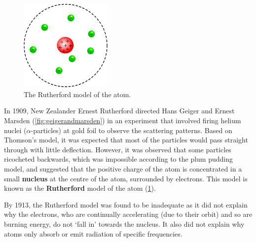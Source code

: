 \documentclass[a4paper]{amsbook}
\theoremstyle{definition}
\numberwithin{exercise}{chapter}
\numberwithin{exercise}{chapter}
\begin{document}
\begin{figure}
  \centering
  \includegraphics[width=0.4\textwidth]{ruthmodel}
  \caption{The Rutherford model of the atom. \label{fig:ruthmodel}}
\end{figure}
In 1909, New Zealander Ernest Rutherford directed Hans Geiger and Ernest Marsden (\cref{fig:geigerandmarsden}) in an experiment
that involved firing helium nuclei ($\alpha$-particles) at gold foil to observe the scattering patterns. Based on Thomson's model,
it was expected that most of the particles would pass straight through with little deflection. However, it was observed that some
particles ricocheted backwards, which was impossible according to the plum pudding model, and suggested that the positive charge
of the atom is concentrated in a small \textbf{nucleus} at the centre of the atom, surrounded by electrons. This model is known
as the \textbf{Rutherford} model of the atom (\cref{fig:ruthmodel}).

By 1913, the Rutherford model was found to be inadequate as it did not explain why the electrons, who are continually accelerating (due
to their orbit) and so are burning energy, do not `fall in' towards the nucleus. It also did not explain why atoms only absorb or emit
radiation of specific frequencies.
\end{document}
